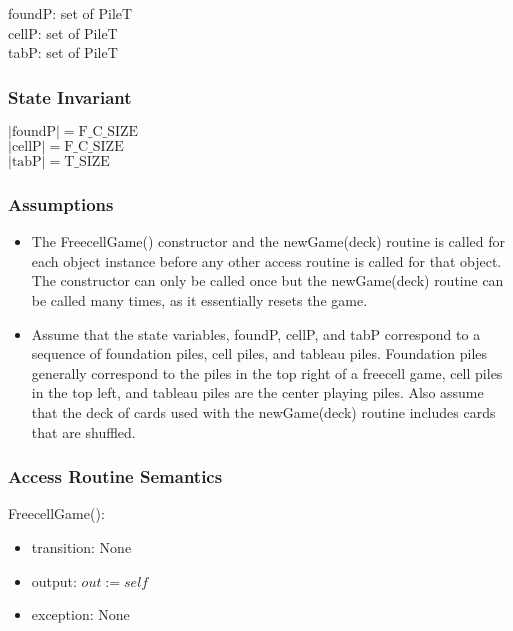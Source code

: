\documentclass[12pt]{article}
\begin{document}
foundP: set of PileT\\
cellP: set of PileT\\
tabP: set of PileT\\

\subsubsection* {State Invariant}

$|\mbox{foundP}| = \mbox{F\_C\_SIZE}$ \\
$|\mbox{cellP}| = \mbox{F\_C\_SIZE}$ \\
$|\mbox{tabP}| = \mbox{T\_SIZE}$

\subsubsection* {Assumptions}

\begin{itemize}
\item The FreecellGame() constructor and the newGame(deck) routine is called for each object instance before any
other access routine is called for that object.  The constructor can only be
called once but the newGame(deck) routine can be called many times, as it essentially resets the game.
\item Assume that the state variables, foundP, cellP, and tabP correspond to a sequence of foundation piles, cell piles, and tableau piles. Foundation piles generally correspond to the piles in the top right of a freecell game, cell piles in the top left, and tableau piles are the center playing piles. Also assume that the deck of cards used with the newGame(deck) routine includes cards that are shuffled. 
\end{itemize}

\subsubsection* {Access Routine Semantics}

FreecellGame():
\begin{itemize}
\item transition: None
\item output: $\mathit{out} := \mathit{self}$
\item exception: None\\
\end{itemize}
\end{document}
